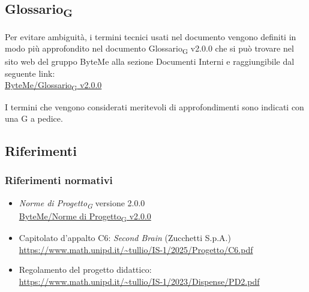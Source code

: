 \documentclass[11pt,a4paper]{article}
\newcommand{\gls}[1]{#1\textsubscript{G}}
\begin{document}
\subsection{\gls{Glossario}}
Per evitare ambiguità, i termini tecnici usati nel documento vengono definiti in modo più approfondito nel documento \gls{Glossario} v2.0.0 che si può trovare nel sito web del gruppo ByteMe alla sezione Documenti Interni e raggiungibile dal seguente link:\\
\href{https://byteme25.github.io/ByteMe/files.html}{ByteMe/\gls{Glossario} v2.0.0}

I termini che vengono considerati meritevoli di approfondimenti sono indicati con una G a pedice.

\subsection{Riferimenti}
\subsubsection{Riferimenti normativi}
\begin{itemize}
  \item \textit{\gls{Norme di Progetto}} versione 2.0.0\\
  \href{https://byteme25.github.io/ByteMe/files.html}{ByteMe/\gls{Norme di Progetto} v2.0.0}
  \item Capitolato d'appalto C6: \textit{Second Brain} (Zucchetti S.p.A.)\\ \url{https://www.math.unipd.it/~tullio/IS-1/2025/Progetto/C6.pdf}
  \item Regolamento del progetto didattico:\\
        \url{https://www.math.unipd.it/~tullio/IS-1/2023/Dispense/PD2.pdf}
\end{itemize}
\end{document}
